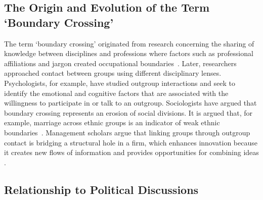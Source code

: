 \documentclass[letterpaper]{article}
\newcommand{\yy}[1]{{\textcolor{green}{yy: #1}}}
\newcommand{\pat}[1]{{\textcolor{red}{Pat: #1}}}
\begin{document}
\subsection{The Origin and Evolution of the Term `Boundary Crossing'}

The term `boundary crossing' originated from research concerning the sharing of knowledge between disciplines and professions where factors such as professional affiliations and jargon created occupational boundaries~\cite{wenger1998communitiesofpractice}. Later, researchers approached contact between groups using different disciplinary lenses. Psychologists, for example, have studied outgroup interactions and seek to identify the emotional and cognitive factors that are associated with the willingness to participate in or talk to an outgroup. Sociologists have argued that boundary crossing represents an erosion of social divisions. It is argued that, for example, marriage across ethnic groups is an indicator of weak ethnic boundaries~\cite{qian2007social}. Management scholars argue that linking groups through outgroup contact is bridging a structural hole in a firm, which enhances innovation because it creates new flows of information and provides opportunities for combining ideas \cite{burt2004structuralholes}. 

\subsection{Relationship to Political Discussions}
\end{document}
